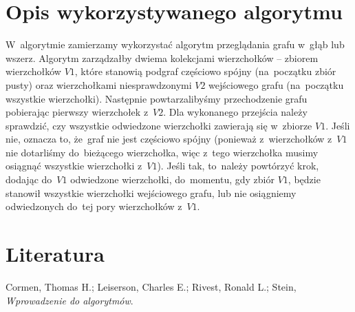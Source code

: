 \documentclass[a4paper,12pt]{mwart}
\begin{document}
\section{Opis wykorzystywanego algorytmu}

W~algorytmie zamierzamy wykorzystać algorytm przeglądania grafu w~głąb lub
wszerz. Algorytm zarządzałby dwiema kolekcjami wierzchołków -- zbiorem
wierzchołków $V1$, które stanowią podgraf częściowo spójny (na~początku zbiór
pusty) oraz wierzchołkami niesprawdzonymi $V2$ wejściowego grafu (na~początku
wszystkie wierzchołki). Następnie powtarzalibyśmy przechodzenie grafu
pobierając pierwszy wierzchołek z~$V2$. Dla wykonanego przejścia należy
sprawdzić, czy wszystkie odwiedzone wierzchołki zawierają się w~zbiorze $V1$.
Jeśli nie, oznacza to, że~graf nie jest częściowo spójny (ponieważ
z~wierzchołków z~$V1$ nie dotarliśmy do~bieżącego wierzchołka, więc z~tego
wierzchołka musimy osiągnąć wszystkie wierzchołki z~$V1$). Jeśli tak, to~należy
powtórzyć krok, dodając do~$V1$ odwiedzone wierzchołki, do~momentu, gdy zbiór
$V1$, będzie stanowił wszystkie wierzchołki wejściowego grafu, lub nie
osiągniemy odwiedzonych do~tej pory wierzchołków z~$V1$.

\section{Literatura}

\noindent Cormen, Thomas H.; Leiserson, Charles E.; Rivest, Ronald L.; Stein,
\emph{Wprowadzenie do algorytmów}.
\end{document}
